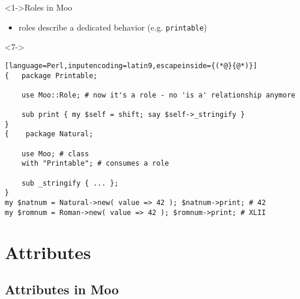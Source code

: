\documentclass[ngerman,xcolor={table,dvipsnames},smaller,compress,hyperref={bookmarks,colorlinks}]{beamer}
\begin{document}
\begin{frame}[t,fragile]

\begin{block}<1->{Roles in Moo}
\begin{itemize}
\item roles describe a dedicated behavior (e.g. \texttt{printable})
\end{itemize}
\end{block}

\begin{block}<7->{}
\scriptsize
\begin{lstlisting}[language=Perl,inputencoding=latin9,escapeinside={(*@}{@*)}]
{   package Printable;

    use Moo::Role; # now it's a role - no 'is a' relationship anymore

    sub print { my $self = shift; say $self->_stringify }
}
{    package Natural;

    use Moo; # class
    with "Printable"; # consumes a role

    sub _stringify { ... };
}
my $natnum = Natural->new( value => 42 ); $natnum->print; # 42
my $romnum = Roman->new( value => 42 ); $romnum->print; # XLII
\end{lstlisting}
\end{block}

\end{frame}

\section{Attributes}

\subsection{Attributes in Moo}
\end{document}

